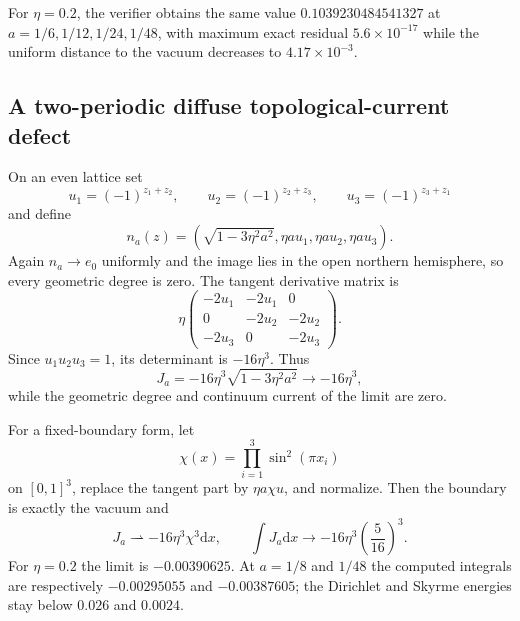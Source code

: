 \documentclass[11pt]{article}
\numberwithin{equation}{section}
\theoremstyle{definition}
\theoremstyle{remark}
\newcommand{\dd}{\mathrm d}
\newcommand{\ezer}{e_0}
\begin{document}
For $\eta=0.2$, the verifier obtains the same value
$0.1039230484541327$ at $a=1/6,1/12,1/24,1/48$, with maximum exact residual
$5.6\times10^{-17}$ while the uniform distance to the vacuum decreases to
$4.17\times10^{-3}$.

\subsection{A two-periodic diffuse topological-current defect}

On an even lattice set
\begin{equation}
 u_1=(-1)^{z_1+z_2},\qquad
 u_2=(-1)^{z_2+z_3},\qquad
 u_3=(-1)^{z_3+z_1}
 \label{eq:checker-u}
\end{equation}
and define
\begin{equation}
 n_a(z)=\left(\sqrt{1-3\eta^2a^2},\eta a u_1,\eta a u_2,\eta a u_3\right).
 \label{eq:current-sequence}
\end{equation}
Again $n_a\to\ezer$ uniformly and the image lies in the open northern
hemisphere, so every geometric degree is zero.  The tangent derivative matrix
is
\begin{equation}
 \eta\begin{pmatrix}
 -2u_1&-2u_1&0\\
 0&-2u_2&-2u_2\\
 -2u_3&0&-2u_3
 \end{pmatrix}.
 \label{eq:checker-matrix}
\end{equation}
Since $u_1u_2u_3=1$, its determinant is $-16\eta^3$.  Thus
\begin{equation}
 \boxed{J_a=-16\eta^3\sqrt{1-3\eta^2a^2}
 \longrightarrow -16\eta^3,}
 \label{eq:diffuse-current}
\end{equation}
while the geometric degree and continuum current of the limit are zero.

For a fixed-boundary form, let
\begin{equation}
 \chi(x)=\prod_{i=1}^3\sin^2(\pi x_i)
 \label{eq:cutoff}
\end{equation}
on $[0,1]^3$, replace the tangent part by $\eta a\chi u$, and normalize.
Then the boundary is exactly the vacuum and
\begin{equation}
 J_a\rightharpoonup -16\eta^3\chi^3\dd x,\qquad
 \int J_a\dd x\longrightarrow
 -16\eta^3\left(\frac5{16}\right)^3.
 \label{eq:localized-current}
\end{equation}
For $\eta=0.2$ the limit is $-0.00390625$.  At $a=1/8$ and $1/48$ the
computed integrals are respectively $-0.00295055$ and $-0.00387605$; the
Dirichlet and Skyrme energies stay below $0.026$ and $0.0024$.
\end{document}
